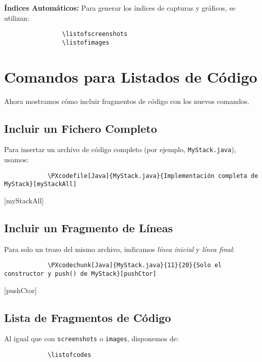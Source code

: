 \documentclass[CAT]{PECTeX}
\begin{document}
			
			\textbf{Índices Automáticos:}
			Para generar los índices de capturas y gráficos, se utilizan:
			\begin{verbatim}
				\listofscreenshots
				\listofimages
			\end{verbatim}
			
		\newpage
		\listofscreenshots
		\listofimages
		\section{Comandos para Listados de Código}
		Ahora mostramos cómo incluir fragmentos de código con los nuevos comandos.
		
		\subsection{Incluir un Fichero Completo}
		Para insertar un archivo de código completo (por ejemplo, \texttt{MyStack.java}), usamos:
		\begin{verbatim}
			\PXcodefile[Java]{MyStack.java}{Implementación completa de MyStack}[myStackAll]
		\end{verbatim}
		
		[myStackAll]
		
		\subsection{Incluir un Fragmento de Líneas}
		Para solo un trozo del mismo archivo, indicamos \emph{línea inicial} y \emph{línea final}:
		\begin{verbatim}
			\PXcodechunk[Java]{MyStack.java}{11}{20}{Solo el constructor y push() de MyStack}[pushCtor]
		\end{verbatim}
		
		[pushCtor]
		
		\subsection{Lista de Fragmentos de Código}
		Al igual que con \texttt{screenshots} o \texttt{images}, disponemos de:
		\begin{verbatim}
			\listofcodes
		\end{verbatim}
		
\end{document}
